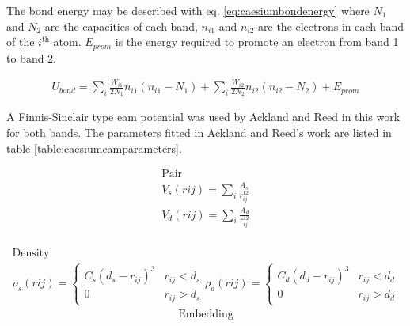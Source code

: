 The bond energy may be described with eq. \ref{eq:caesiumbondenergy} where $N_1$ and $N_2$ are the capacities of each band, $n_{i1}$ and $n_{i2}$ are the electrons in each band of the $i^{\text{th}}$ atom.  $E_{prom}$ is the energy required to promote an electron from band 1 to band 2.

\begin{equation}
\begin{split}
U_{bond} = \sum_i \frac{W_{i1}}{2N_1} n_{i1}(n_{i1} - N_1) + \sum_i \frac{W_{i2}}{2N_2} n_{i2}(n_{i2} - N_2) + E_{prom}
\end{split}
\label{eq:caesiumbondenergy}
\end{equation}

A Finnis-Sinclair type \acrshort{eam} potential was used by Ackland and Reed in this work for both bands.  The parameters fitted in Ackland and Reed's work are listed in table \ref{table:caesiumeamparameters}.  

\begin{equation}
\begin{split}
\text{Pair} \\
V_s(r{ij}) = \sum_i \frac{A_s}{r^{12}_{ij}} \\
V_d(r{ij}) = \sum_i \frac{A_d}{r^{12}_{ij}} \\
\end{split}
\label{eq:caesium2beampair}
\end{equation}

\begin{equation}
\begin{split}
\text{Density} \\
\rho_s(r{ij}) = \left\{ \begin{matrix}  C_s(d_s - r_{ij})^3 & r_{ij}<d_s \\  0 & r_{ij} > d_s \end{matrix} \right . 
\rho_d(r{ij}) = \left\{ \begin{matrix} C_d(d_d - r_{ij})^3 & r_{ij}<d_d \\  0 & r_{ij} > d_d \end{matrix} \right . 
\end{split}
\label{eq:caesium2beamdensity}
\end{equation}
\begin{equation}
\begin{split}
\text{Embedding} \\
\end{split}
\label{eq:caesium2beamembedding}
\end{equation}

